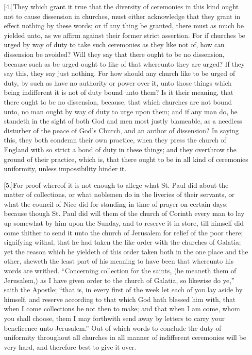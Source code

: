 [4.]They which grant it true that the diversity of ceremonies in this kind ought not to cause dissension in churches, must either acknowledge that they grant in effect nothing by these words; or if any thing be granted, there must as much be yielded unto, as we affirm against their former strict assertion. For if churches be urged by way of duty to take such ceremonies as they like not of, how can dissension be avoided? Will they say that there ought to be no dissension, because such as be urged ought to like of that whereunto they are urged? If they say this, they say just nothing. For how should any church like to be urged of duty, by such as have no authority or power over it, unto those things which being indifferent it is not of duty bound unto them? Is it their meaning, that there ought to be no dissension, because, that which churches are not bound unto, no man ought by way of duty to urge upon them; and if any man do, he standeth in the sight of both God and men most justly blameable, as a needless disturber of the peace of God’s Church, and an author of dissension? In saying this, they both condemn their own practice, when they press the church of England with so strict a bond of duty in these things; and they overthrow the ground of their practice, which is, that there ought to be in all kind of ceremonies uniformity, unless impossibility hinder it.

[5.]For proof whereof it is not enough to allege what St. Paul did about the matter of collections, or what noblemen do in the liveries of their servants, or what the council of Nice did for standing in time of prayer on certain days: because though St. Paul did will them of the church of Corinth every man to lay up somewhat by him upon the Sunday, and to  reserve it in store, till himself did come thither to send it unto the church of Jerusalem for relief of the poor there; signifying withal, that he had taken the like order with the churches of Galatia; yet the reason which he yieldeth of this order taken both in the one place and the other, sheweth the least part of his meaning to have been that whereunto his words are writhed. “Concerning collection for the saints, (he meaneth them of Jerusalem,) as I have given order to the church of Galatia, so likewise do ye,” saith the Apostle; “that is, in every first of the week let each of you lay aside by himself, and reserve according to that which God hath blessed him with, that when I come collections be not then to make; and that when I am come, whom you shall choose, them I may forthwith send away by letters to carry your beneficence unto Jerusalem.” Out of which words to conclude the duty of uniformity throughout all churches in all manner of indifferent ceremonies will be very hard, and therefore best to give it over.

